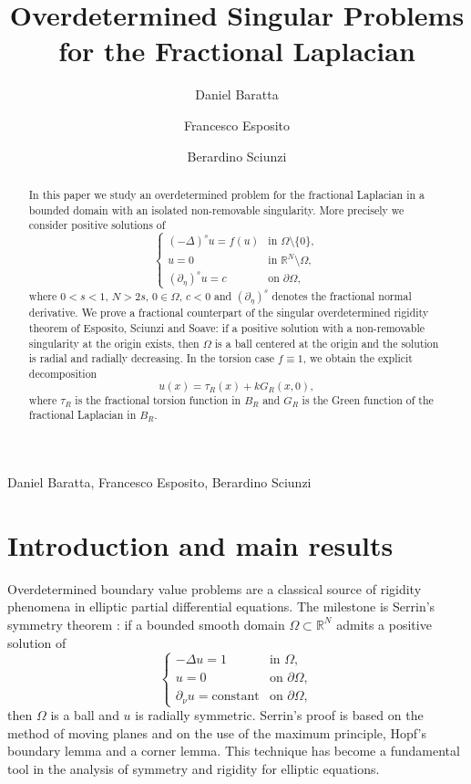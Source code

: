 \documentclass[11pt,a4paper]{article}
\title{\bfseries\LARGE Overdetermined Singular Problems\\[0.25em]
for the Fractional Laplacian}
\author{Daniel Baratta \and Francesco Esposito \and Berardino Sciunzi}
\date{}
\newcommand{\R}{\mathbb R}
\begin{document}
\begin{center}
\vspace*{0.4cm}
\par
\vspace{0.75cm}
{\large Daniel Baratta, Francesco Esposito, Berardino Sciunzi\par}
\vspace{0.85cm}
\end{center}

\begin{abstract}
In this paper we study an overdetermined problem for the fractional Laplacian in a bounded domain with an isolated non-removable singularity. More precisely we consider positive solutions of
\[
\begin{cases}
(-\Delta)^s u=f(u) & \text{in }\Omega\setminus\{0\},\\
u=0 & \text{in }\R^N\setminus\Omega,\\
(\partial_\eta)^s u=c & \text{on }\partial\Omega,
\end{cases}
\]
where \(0<s<1\), \(N>2s\), \(0\in\Omega\), \(c<0\) and \((\partial_\eta)^s\) denotes the fractional normal derivative. We prove a fractional counterpart of the singular overdetermined rigidity theorem of Esposito, Sciunzi and Soave: if a positive solution with a non-removable singularity at the origin exists, then \(\Omega\) is a ball centered at the origin and the solution is radial and radially decreasing. In the torsion case \(f\equiv1\), we obtain the explicit decomposition
\[
u(x)=\tau_{R}(x)+k G_{R}(x,0),
\]
where \(\tau_{R}\) is the fractional torsion function in \(B_R\) and \(G_{R}\) is the Green function of the fractional Laplacian in \(B_R\).
\end{abstract}


\section{Introduction and main results}
\label{sec:introduction}

Overdetermined boundary value problems are a classical source of rigidity phenomena in elliptic partial differential equations. The milestone is Serrin's symmetry theorem \cite{Serrin}: if a bounded smooth domain \(\Omega\subset\R^N\) admits a positive solution of
\[
\begin{cases}
-\Delta u=1 & \text{in }\Omega,\\
u=0 & \text{on }\partial\Omega,\\
\partial_\nu u=\text{constant} & \text{on }\partial\Omega,
\end{cases}
\]
then \(\Omega\) is a ball and \(u\) is radially symmetric. Serrin's proof is based on the method of moving planes and on the use of the maximum principle, Hopf's boundary lemma and a corner lemma. This technique has become a fundamental tool in the analysis of symmetry and rigidity for elliptic equations.
\end{document}
